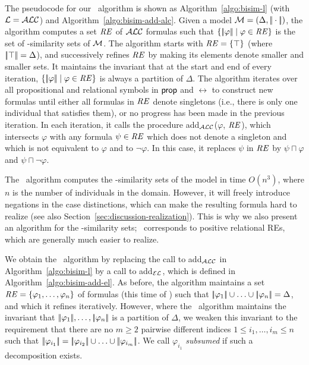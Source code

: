 The pseudocode for our \alc\ algorithm is shown as
Algorithm~\ref{algo:bisim-l} (with $\mathcal{L}=\mathcal{ALC}$) and
Algorithm~\ref{algo:bisim-add-alc}.  Given a model $\mathcal{M}=(\Delta,
|\!|\cdot|\!|)$, the algorithm computes a set $\mathit{RE}$ of $\mathcal{ALC}$
formulas such that $\{|\!|\varphi|\!| \mid \varphi \in \mathit{RE}\}$ is the
set of \alc-similarity sets of $\mathcal{M}$.  The algorithm starts with $\mathit{RE}
= \{\top\}$ (where $|\!|\top|\!| = \Delta$), and successively refines
$\mathit{RE}$ by making its elements denote smaller and smaller sets.  It
maintains the invariant that at the start and end of every iteration,
$\{|\!|\varphi|\!| \mid \varphi \in \mathit{RE}\}$ is always a partition of
$\Delta$.  The algorithm iterates over all propositional and
relational symbols in $\mathsf{prop}$ and $\rel$ to construct new formulas
until either all formulas in $\mathit{RE}$ denote singletons (i.e., there is
only one individual that satisfies them), or no progress has been made
in the previous iteration.  In each iteration, it calls the procedure
add$_\mathcal{ALC}$($\varphi$, $\mathit{RE}$), which intersects $\varphi$ with any
formula $\psi \in \mathit{RE}$ which does not denote a singleton and which is
not equivalent to $\varphi$ and to $\neg \varphi$. In this case, it
replaces $\psi$ in $\mathit{RE}$ by $\psi \sqcap \varphi$ and $\psi \sqcap
\neg \varphi$.



The \alc\ algorithm computes the \alc-similarity sets of the model in
time $O(n^3)$, where $n$ is the number of individuals in the domain.
However, it will freely introduce negations in the case distinctions,
which can make the resulting formula hard to realize (see also
Section~\ref{sec:discussion-realization}).  This is why we also
present an algorithm for the \el-similarity sets; \el\ corresponds to
positive relational REs, which are generally much easier to realize.

We obtain the \el\ algorithm by replacing the call to add$_{\mathcal{ALC}}$ in
Algorithm~\ref{algo:bisim-l} by a call to add$_{\mathcal{EL}}$, which is
defined in Algorithm~\ref{algo:bisim-add-el}.  As before, the
algorithm maintains a set $\mathit{RE} = \{\varphi_1,\ldots,\varphi_n\}$ of
formulas (this time of \el) such that $|\!|\varphi_1|\!| \cup \ldots
\cup |\!|\varphi_n|\!| = \Delta$, and which it refines iteratively.
However, where the \alc\ algorithm maintains the invariant that
$|\!|\varphi_1|\!|,\ldots,|\!|\varphi_n|\!|$ is a partition of
$\Delta$, we weaken this invariant to the requirement that there are
no $m \geq 2$ pairwise different indices $1 \leq i_1,\ldots,i_m \leq
n$ such that $|\!|\varphi_{i_1}|\!| = |\!|\varphi_{i_2}|\!| \cup
\ldots \cup |\!|\varphi_{i_m}|\!|$.  We call $\varphi_{i_1}$
\emph{subsumed} if such a decomposition exists.

